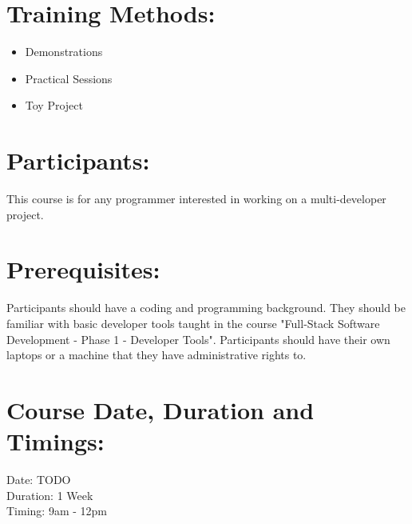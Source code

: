 \documentclass[a4paper,11pt]{article}
\begin{document}
\section{Training Methods:}
\begin{itemize}
	\item Demonstrations
	\item Practical Sessions
	\item Toy Project
\end{itemize}

\section{Participants:}
This course is for any programmer interested in working on a multi-developer project. 

\section{Prerequisites:}
Participants should have a coding and programming background. They should be familiar with basic developer tools taught in the course "Full-Stack Software Development - Phase 1 - Developer Tools". Participants should have their own laptops or a machine that they have administrative rights to.

\section{Course Date, Duration and Timings:}
Date: TODO\\
Duration: 1 Week\\
Timing: 9am - 12pm
\end{document}
